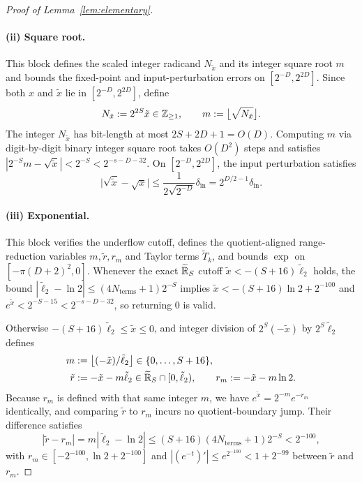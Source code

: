 \begin{proof}[Proof of Lemma~\ref{lem:elementary}]
\paragraph{(ii) Square root.}
This block defines the scaled integer radicand $N_{\tilde{x}}$ and its integer square root $m$ and bounds the fixed-point and input-perturbation errors on $[2^{-D}, 2^{2D}]$.
Since both $x$ and $\tilde{x}$ lie in $[2^{-D}, 2^{2D}]$, define
\[
  N_{\tilde{x}} := 2^{2S} \tilde{x} \in \mathbb{Z}_{\ge 1}, \qquad m := \bigl\lfloor \sqrt{N_{\tilde{x}}} \bigr\rfloor.
\]
The integer $N_{\tilde{x}}$ has bit-length at most $2S + 2D + 1 = O(D)$. Computing $m$ via digit-by-digit binary integer square root takes $O(D^2)$ steps and satisfies $|2^{-S} m - \sqrt{\tilde{x}}| < 2^{-S} < 2^{-s-D-32}$. On $[2^{-D}, 2^{2D}]$, the input perturbation satisfies
\[
  \bigl|\sqrt{\tilde{x}} - \sqrt{x}\bigr| \le \frac{1}{2\sqrt{2^{-D}}}\delta_{\mathrm{in}} = 2^{D/2-1}\delta_{\mathrm{in}}.
\]

\paragraph{(iii) Exponential.}
This block verifies the underflow cutoff, defines the quotient-aligned range-reduction variables $m, \tilde{r}, r_m$ and Taylor terms $\tilde{T}_k$, and bounds $\exp$ on $[-\pi(D+2)^2, 0]$.
Whenever the exact $\widetilde{\mathbb{R}}_S$ cutoff $\tilde{x} < -(S + 16)\tilde{\ell}_2$ holds, the bound $|\tilde{\ell}_2 - \ln 2| \le (4N_{\mathrm{terms}} + 1)2^{-S}$ implies $\tilde{x} < -(S + 16)\ln 2 + 2^{-100}$ and $e^{\tilde{x}} < 2^{-S-15} < 2^{-s-D-32}$, so returning $0$ is valid.

Otherwise $-(S + 16)\tilde{\ell}_2 \le \tilde{x} \le 0$, and integer division of $2^S(-\tilde{x})$ by $2^S\tilde{\ell}_2$ defines
\begin{align*}
  m &:= \bigl\lfloor (-\tilde{x})/\tilde{\ell}_2 \bigr\rfloor \in \{0, \dots, S + 16\}, \\
  \tilde{r} &:= -\tilde{x} - m\tilde{\ell}_2 \in \widetilde{\mathbb{R}}_S \cap [0, \tilde{\ell}_2), \qquad r_m := -\tilde{x} - m\ln 2.
\end{align*}
Because $r_m$ is defined with that same integer $m$, we have $e^{\tilde{x}} = 2^{-m} e^{-r_m}$ identically, and comparing $\tilde{r}$ to $r_m$ incurs no quotient-boundary jump. Their difference satisfies
\[
  |\tilde{r} - r_m| = m|\tilde{\ell}_2 - \ln 2| \le (S + 16)(4N_{\mathrm{terms}} + 1)2^{-S} < 2^{-100},
\]
with $r_m \in [-2^{-100}, \ln 2 + 2^{-100}]$ and $|(e^{-t})'| \le e^{2^{-100}} < 1 + 2^{-99}$ between $\tilde{r}$ and $r_m$.


\end{proof}
